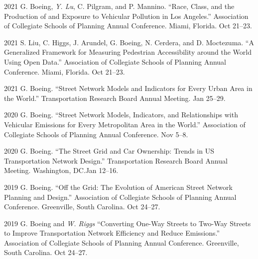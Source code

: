 \documentclass[11pt,letterpaper]{report}
\begin{document}
\begin{tablist}
        \item[2021] \tab{}G. Boeing, \textit{Y. Lu}, C. Pilgram, and P. Mannino. \enquote{Race, Class, and the Production of and Exposure to Vehicular Pollution in Los Angeles.} Association of Collegiate Schools of Planning Annual Conference. Miami, Florida. Oct 21--23.

        \item[2021] \tab{}S. Liu, C. Higgs, J. Arundel, G. Boeing, N. Cerdera, and D. Moctezuma. \enquote{A Generalized Framework for Measuring Pedestrian Accessibility around the World Using Open Data.} Association of Collegiate Schools of Planning Annual Conference. Miami, Florida. Oct 21--23.

        \item[2021] \tab{}G. Boeing. \enquote{Street Network Models and Indicators for Every Urban Area in the World.} Transportation Research Board Annual Meeting. Jan 25--29.

        \item[2020] \tab{}G. Boeing. \enquote{Street Network Models, Indicators, and Relationships with Vehicular Emissions for Every Metropolitan Area in the World.} Association of Collegiate Schools of Planning Annual Conference. Nov 5--8.


        \item[2020] \tab{}G. Boeing. \enquote{The Street Grid and Car Ownership: Trends in US Transportation Network Design.} Transportation Research Board Annual Meeting. Washington, DC.\@ Jan 12--16.

        \item[2019] \tab{}G. Boeing. \enquote{Off the Grid: The Evolution of American Street Network Planning and Design.} Association of Collegiate Schools of Planning Annual Conference. Greenville, South Carolina. Oct 24--27.

        \item[2019] \tab{}G. Boeing and \textit{W. Riggs} \enquote{Converting One-Way Streets to Two-Way Streets to Improve Transportation Network Efficiency and Reduce Emissions.} Association of Collegiate Schools of Planning Annual Conference. Greenville, South Carolina. Oct 24--27.


\end{tablist}
\end{document}
